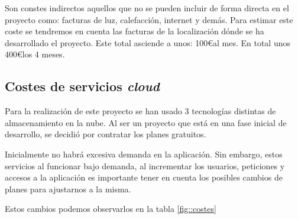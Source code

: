 Son constes indirectos aquellos que no se pueden incluir de forma directa en el proyecto como: facturas de luz, calefacción, internet y demás. Para estimar este coste se tendremos en cuenta las facturas de la localización dónde se ha desarrollado el proyecto. Este total asciende a unos: 100\euro al mes. En total unos 400\euro los 4 meses.

\subsection{Costes de servicios \textit{cloud}}

Para la realización de este proyecto se han usado 3 tecnologías distintas de almacenamiento en la nube. Al ser un proyecto que está en una fase inicial de desarrollo, se decidió por contratar los planes gratuitos. 

Inicialmente no habrá excesiva demanda en la aplicación. Sin embargo, estos servicios al funcionar bajo demanda, al incrementar los usuarios, peticiones y accesos a la aplicación es importante tener en cuenta los posibles cambios de planes para ajustarnos a la misma. 

Estos cambios podemos observarlos en la tabla \ref{fig::costes}

